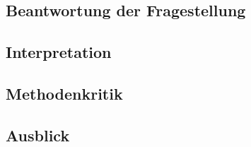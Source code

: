 \subsection{Beantwortung der Fragestellung} \label{sec:BeantwortungFragestellung}

\subsection{Interpretation} \label{sec:Interpretation}

\subsection{Methodenkritik} \label{sec:Methodenkritik}

\subsection{Ausblick} \label{sec:Ausblick}